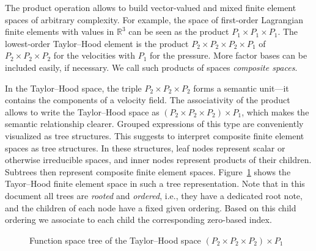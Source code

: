 \documentclass[a4paper,10pt,headings=normal,bibliography=totoc]{scrartcl}
\newcommand{\R}{\mathbb{R}}
\begin{document}
The product operation allows to build vector-valued and mixed finite element spaces of arbitrary complexity.
For example, the space of
first-order Lagrangian finite elements with values in $\R^3$ can be seen as the product $P_1 \times P_1 \times P_1$.
The lowest-order Taylor--Hood element is the product $P_2 \times P_2 \times P_2 \times P_1$
of $P_2 \times P_2 \times P_2$ for the velocities with $P_1$ for the pressure.
More factor bases can be included easily, if necessary.  We call such products of
spaces \emph{composite spaces}.

In the Taylor--Hood space, the triple
$P_2 \times P_2 \times P_2$ forms a semantic unit---it contains the components of a velocity field.
The associativity of the product allows to write the Taylor--Hood space
as $(P_2 \times P_2 \times P_2) \times P_1$, which makes the semantic relationship clearer.
Grouped expressions of this type are conveniently visualized as tree structures.  This
suggests to interpret composite
finite element spaces as tree structures.  In these structures, leaf nodes represent scalar or otherwise irreducible spaces,
and inner nodes represent products of their children.  Subtrees then represent composite
finite element spaces.  Figure~\ref{fig:taylor_hood_space_tree} shows the Tayor--Hood finite element
space in such a tree representation. Note that in this document all trees are \emph{rooted} and \emph{ordered},
i.e., they have a dedicated root note, and the children of each node have a fixed given ordering.
Based on this child ordering we associate to each child the corresponding zero-based index.

\begin{figure}
    \begin{center}
    \end{center}
    \caption{Function space tree of the Taylor--Hood space $(P_2 \times P_2 \times P_2)\times P_1$}
    \label{fig:taylor_hood_space_tree}
\end{figure}
\end{document}
